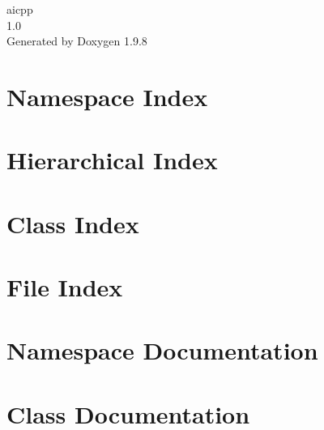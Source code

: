 \documentclass[twoside]{book}
\newcommand{\+}{\discretionary{\mbox{\scriptsize$\hookleftarrow$}}{}{}}
\newcommand{\clearemptydoublepage}{%
    \newpage{\pagestyle{empty}\cleardoublepage}%
  }
\begin{document}
  \raggedbottom
    \hypersetup{pageanchor=false,
                bookmarksnumbered=true,
                pdfencoding=unicode
               }
  \begin{titlepage}
  \vspace*{7cm}
  \begin{center}%
  {\Large aicpp}\\
  [1ex]\large 1.\+0 \\
  \vspace*{1cm}
  {\large Generated by Doxygen 1.9.8}\\
  \end{center}
  \end{titlepage}
  \clearemptydoublepage
  \tableofcontents
  \clearemptydoublepage
  \hypersetup{pageanchor=true}
\chapter{Namespace Index}

\chapter{Hierarchical Index}

\chapter{Class Index}

\chapter{File Index}

\chapter{Namespace Documentation}






\chapter{Class Documentation}









\end{document}
